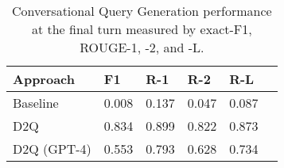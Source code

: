 
\begin{table}[t]  \small
\centering
\setlength{\tabcolsep}{4pt}
\begin{tabular}{llllll}
\hline
\textbf{Approach} & \textbf{F1} & \textbf{R-1} & \textbf{R-2} & \textbf{R-L}\\ \hline
Baseline & 0.008 & 0.137 & 0.047 & 0.087  \\  \hline  
D2Q & 0.834 & 0.899 & 0.822 & 0.873 \\ \hline
D2Q (GPT-4) & 0.553 & 0.793 & 0.628 & 0.734 \\ \hline
\end{tabular}
\vspace{-0.5em}
\caption{Conversational Query Generation performance at the final turn measured by exact-F1, ROUGE-1, -2, and -L.}
\label{tab:conversational_query_generation}
\vspace{-2em}
\end{table}

